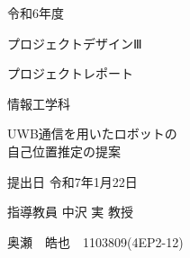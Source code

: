 \documentclass[main]{subfiles}
\begin{document}
\begin{titlepage}
    \centering

    \fontsize{15pt}{15pt} \selectfont
    令和6年度
    \vspace{3pt}

    \fontsize{15pt}{15pt} \selectfont
    プロジェクトデザインⅢ
    \vspace{3pt}  

    \fontsize{15pt}{15pt} \selectfont
    プロジェクトレポート
    \vspace{3pt}

    \fontsize{15pt}{15pt} \selectfont
    情報工学科
    \vspace{80pt}
    \vspace{80pt}

    \fontsize{25pt}{25pt} \selectfont
    UWB通信を用いたロボットの \\ 
    自己位置推定の提案
    \vspace{80pt}
    \vspace{80pt}

    \fontsize{15pt}{15pt} \selectfont
    提出日 令和7年1月22日
    \vspace{30pt}

    \fontsize{15pt}{15pt} \selectfont
    指導教員 中沢 実 教授
    \vspace{60pt}

    \fontsize{15pt}{15pt} \selectfont
    奥瀬　皓也　1103809(4EP2-12)
    \vspace{15pt}

    \normalsize

\end{titlepage}
\end{document}
